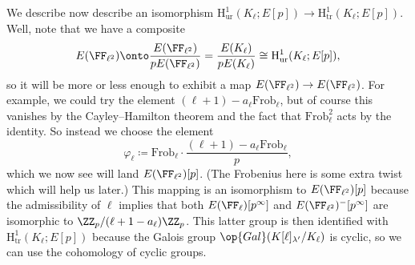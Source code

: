 \documentclass[../notes.tex]{subfiles}
\begin{document}
We describe now describe an isomorphism $\mathrm H^1_{\mathrm{ur}}(K_\ell;E[p])\to\mathrm H^1_{\mathrm{tr}}(K_\ell;E[p])$. Well, note that we have a composite
\[E(\FF_{\ell^2})\onto\frac{E(\FF_{\ell^2})}{pE(\FF_{\ell^2})}=\frac{E(K_\ell)}{pE(K_\ell)}\cong\mathrm H^1_{\mathrm{ur}}(K_\ell;E[p]),\]
so it will be more or less enough to exhibit a map $E(\FF_{\ell^2})\to E(\FF_{\ell^2})$. For example, we could try the element $(\ell+1)-a_\ell\mathrm{Frob}_\ell$, but of course this vanishes by the Cayley--Hamilton theorem and the fact that $\mathrm{Frob}_\ell^2$ acts by the identity. So instead we choose the element
\[\varphi_\ell\coloneqq\mathrm{Frob}_\ell\cdot\frac{(\ell+1)-a_\ell\mathrm{Frob}_\ell}p,\]
which we now see will land $E(\FF_{\ell^2})[p]$. (The Frobenius here is some extra twist which will help us later.) This mapping is an isomorphism to $E(\FF_{\ell^2})[p]$ because the admissibility of $\ell$ implies that both $E(\FF_\ell)[p^\infty]$ and $E(\FF_{\ell^2})^-[p^\infty]$ are isomorphic to $\ZZ_p/(\ell+1-a_\ell)\ZZ_p$. This latter group is then identified with $\mathrm H^1_{\mathrm{tr}}(K_\ell;E[p])$ because the Galois group $\op{Gal}(K[\ell]_{\lambda'}/K_\ell)$ is cyclic, so we can use the cohomology of cyclic groups.
\end{document}
